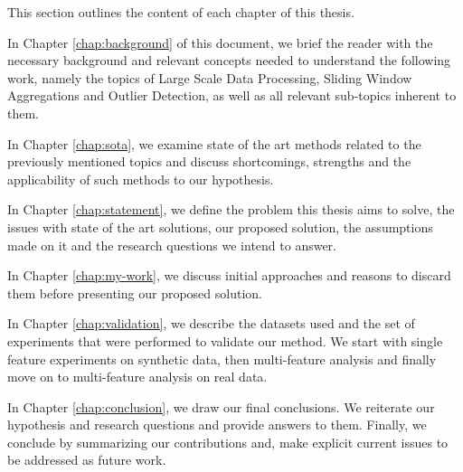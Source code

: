 This section outlines the content of each chapter of this thesis.

In Chapter \ref{chap:background} of this document, we brief the reader with the necessary background and relevant concepts needed to understand the following work, namely the topics of Large Scale Data Processing, Sliding Window Aggregations and Outlier Detection, as well as all relevant sub-topics inherent to them. 

In Chapter \ref{chap:sota}, we examine state of the art methods related to the previously mentioned topics and discuss shortcomings, strengths and the applicability of such methods to our hypothesis.

In Chapter \ref{chap:statement}, we define the problem this thesis aims to solve, the issues with state of the art solutions, our proposed solution, the assumptions made on it and the research questions we intend to answer.

In Chapter \ref{chap:my-work}, we discuss initial approaches and reasons to discard them before presenting our proposed solution.

In Chapter \ref{chap:validation}, we describe the datasets used and the set of experiments that were performed to validate our method. We start with single feature experiments on synthetic data, then multi-feature analysis and finally move on to multi-feature analysis on real data.

In Chapter \ref{chap:conclusion}, we draw our final conclusions. We reiterate our hypothesis and research questions and provide answers to them. Finally, we conclude by summarizing our contributions and, make explicit current issues to be addressed as future work.
